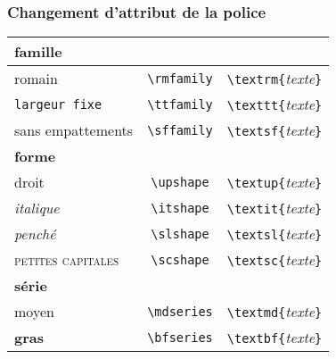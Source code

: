 \begin{frame}[c]

	\frametitle{Changement d'attribut de la police}
	
	\begin{center}
		\begin{tabular}{lcc}
			\hline\hline		
			\textbf{famille}					&										&	\\
			\hline
			\textrm{romain}						&	\texttt{\textbackslash rmfamily}	&	\texttt{\textbackslash textrm\{}\emph{texte}\texttt{\}} \\
			\texttt{largeur fixe}				&	\texttt{\textbackslash ttfamily}	&	\texttt{\textbackslash texttt\{}\emph{texte}\texttt{\}} \\
			\textsf{sans empattements}			&	\texttt{\textbackslash sffamily}	&	\texttt{\textbackslash textsf\{}\emph{texte}\texttt{\}} \\
			\hline
			\textbf{forme}						&										&	\\
			\hline
			\textup{droit}						&	\texttt{\textbackslash upshape}		&	\texttt{\textbackslash textup\{}\emph{texte}\texttt{\}} \\
			\textit{italique}					&	\texttt{\textbackslash itshape}		&	\texttt{\textbackslash textit\{}\emph{texte}\texttt{\}} \\
			\textsl{penché}						&	\texttt{\textbackslash slshape}		&	\texttt{\textbackslash textsl\{}\emph{texte}\texttt{\}} \\
			\textrm{\textsc{petites capitales}}	&	\texttt{\textbackslash scshape}		&	\texttt{\textbackslash textsc\{}\emph{texte}\texttt{\}} \\
			\hline
			\textbf{série}						&										&	\\
			\hline
			\textmd{moyen}						&	\texttt{\textbackslash mdseries}	&	\texttt{\textbackslash textmd\{}\emph{texte}\texttt{\}} \\
			\textbf{gras}						&	\texttt{\textbackslash bfseries}	&	\texttt{\textbackslash textbf\{}\emph{texte}\texttt{\}} \\
			\hline\hline
		\end{tabular}
	\end{center}
\end{frame}



